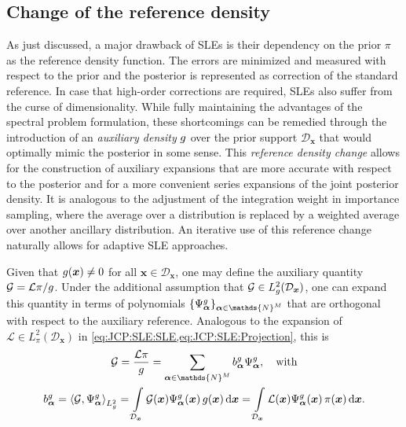 \subsection{Change of the reference density}
As just discussed, a major drawback of SLEs is their dependency on the prior \(\pi\) as the reference density function.
The errors are minimized and measured with respect to the prior and the posterior is represented as correction of the standard reference.
In case that high-order corrections are required, SLEs also suffer from the curse of dimensionality.
While fully maintaining the advantages of the spectral problem formulation, these shortcomings can be remedied through the introduction of an
\emph{auxiliary density} \(g\) over the prior support \(\mathcal{D}_{\bm{x}}\) that would optimally mimic the posterior in some sense.
This \emph{reference density change} allows for the construction of auxiliary expansions that are more accurate with respect to the posterior
and for a more convenient series expansions of the joint posterior density.
It is analogous to the adjustment of the integration weight in importance sampling,
where the average over a distribution is replaced by a weighted average over another ancillary distribution.
An iterative use of this reference change naturally allows for adaptive SLE approaches.
\par %
Given that \(g(\bm{x}) \neq 0\) for all \(\bm{x} \in \mathcal{D}_{\bm{x}}\), one may define the auxiliary quantity \(\mathcal{G} = \mathcal{L} \pi / g \).
Under the additional assumption that \(\mathcal{G} \in L_{g}^2(\mathcal{D}_{\bm{x}})\), one can expand this quantity in terms of polynomials
\(\{\basisBase_{\bm{\alpha}}\}_{\bm{\alpha} \in \mathds{N}^\dimParam}\) that are orthogonal with respect to the auxiliary reference.
Analogous to the expansion of \(\mathcal{L} \in L_{\pi}^2(\mathcal{D}_{\bm{x}})\) in \cref{eq:JCP:SLE:SLE,eq:JCP:SLE:Projection}, this is
\begin{gather}
  \auxQuantity
  = \frac{\mathcal{L} \pi}{\newBase}
  = \sum\limits_{\bm{\alpha} \in \mathds{N}^\dimParam} \coeffBaseL_{\bm{\alpha}} \basisBase_{\bm{\alpha}}, \quad \text{with} \label{eq:JCP:SLE:BaselineChange:SLE} \\
  \coeffBaseL_{\bm{\alpha}}
  = \left\langle \auxQuantity, \basisBase_{\bm{\alpha}} \right\rangle_{L_{\newBase}^2}
  = \int\limits_{\mathcal{D}_{\bm{x}}} \auxQuantity(\bm{x}) \basisBase_{\bm{\alpha}}(\bm{x}) \, \newBase(\bm{x}) \, \mathrm{d} \bm{x}
  = \int\limits_{\mathcal{D}_{\bm{x}}} \mathcal{L}(\bm{x}) \basisBase_{\bm{\alpha}}(\bm{x}) \, \pi(\bm{x}) \, \mathrm{d} \bm{x}. \label{eq:JCP:SLE:BaselineChange:Projection}
\end{gather}
